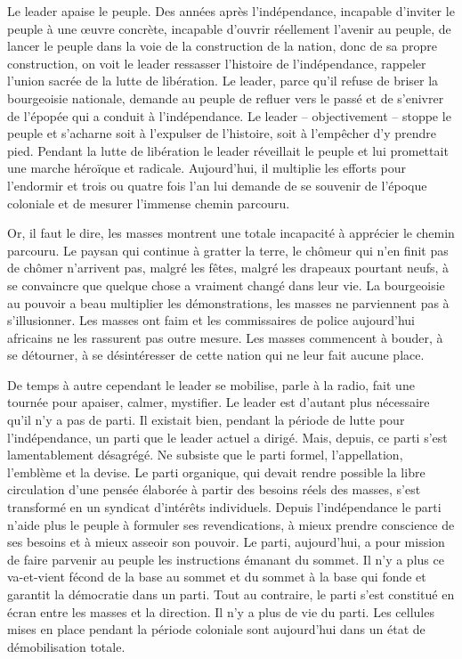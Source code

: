 \documentclass[french,twoside]{book} %
\begin{document}
Le leader apaise le peuple. Des années après l’indépendance, incapable d’inviter le peuple à une œuvre concrète, incapable d’ouvrir réellement l’avenir au peuple, de lancer le peuple dans la voie de la construction de la nation, donc de sa propre construction, on voit le leader ressasser l’histoire de l’indépendance, rappeler l’union sacrée de la lutte de libération. Le leader, parce qu’il refuse de briser la bourgeoisie nationale, demande au peuple de refluer vers le passé et de s’enivrer de l’épopée qui a conduit à l’indépendance. Le leader – objectivement – stoppe le   peuple et s’acharne soit à l’expulser de l’histoire, soit à l’empêcher d’y prendre pied. Pendant la lutte de libération le leader réveillait le peuple et lui promettait une marche héroïque et radicale. Aujourd’hui, il multiplie les efforts pour l’endormir et trois ou quatre fois l’an lui demande de se souvenir de l’époque coloniale et de mesurer l’immense chemin parcouru.\par
Or, il faut le dire, les masses montrent une totale incapacité à apprécier le chemin parcouru. Le paysan qui continue à gratter la terre, le chômeur qui n’en finit pas de chômer n’arrivent pas, malgré les fêtes, malgré les drapeaux pourtant neufs, à se convaincre que quelque chose a vraiment changé dans leur vie. La bourgeoisie au pouvoir a beau multiplier les démonstrations, les masses ne parviennent pas à s’illusionner. Les masses ont faim et les commissaires de police aujourd’hui africains ne les rassurent pas outre mesure. Les masses commencent à bouder, à se détourner, à se désintéresser de cette nation qui ne leur fait aucune place.\par
De temps à autre cependant le leader se mobilise, parle à la radio, fait une tournée pour apaiser, calmer, mystifier. Le leader est d’autant plus nécessaire qu’il n’y a pas de parti. Il existait bien, pendant la période de lutte pour l’indépendance, un parti que le leader actuel a dirigé. Mais, depuis, ce parti s’est lamentablement désagrégé. Ne subsiste que le parti formel, l’appellation, l’emblème et la devise. Le parti organique, qui devait rendre possible la libre circulation d’une pensée élaborée à partir des besoins réels des masses, s’est transformé en un syndicat d’intérêts individuels. Depuis l’indépendance le parti n’aide plus le peuple à formuler ses revendications, à mieux prendre conscience de ses besoins et à mieux asseoir son pouvoir. Le parti, aujourd’hui, a pour mission de faire parvenir au peuple les instructions émanant du sommet. Il n’y a plus ce va-et-vient fécond de la base au sommet et du sommet à la base qui fonde et garantit la démocratie dans un parti. Tout au contraire, le parti s’est constitué en écran entre les masses et la direction. Il n’y a plus de vie du parti. Les cellules mises en place pendant la   période coloniale sont aujourd’hui dans un état de démobilisation totale.\par
\end{document}
